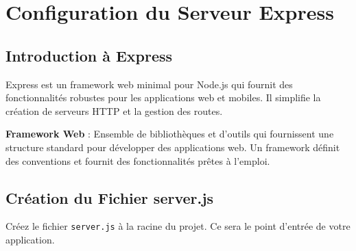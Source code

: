 \chapter{Configuration du Serveur Express}

\section{Introduction à Express}

Express est un framework web minimal pour Node.js qui fournit des fonctionnalités robustes pour les applications web et mobiles. Il simplifie la création de serveurs HTTP et la gestion des routes.

\begin{definitionbox}
    \textbf{Framework Web} : Ensemble de bibliothèques et d'outils qui fournissent une structure standard pour développer des applications web. Un framework définit des conventions et fournit des fonctionnalités prêtes à l'emploi.
\end{definitionbox}

\section{Création du Fichier server.js}

Créez le fichier \texttt{server.js} à la racine du projet. Ce sera le point d'entrée de votre application.


